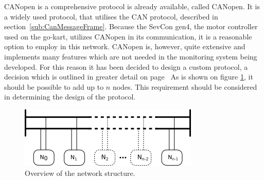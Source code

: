 CANopen is a comprehensive protocol is already available, called CANopen.
It is a widely used protocol, that utilises the CAN protocol, described in section~\ref{sub:CanMessageFrame}.
Because the SevCon gen4, the motor controller used on the go-kart, utilizes CANopen in its communication, it is a reasonable option to employ in this network.
CANopen is, however, quite extensive and implements many features which are not needed in the monitoring system being developed.
For this reason it has been decided to design a custom protocol, a decision which is outlined in greater detail on page~\pageref{sub:CANopen}
As is shown on figure \ref{fig:analysisnodes}, it should be possible to add up to $n$ nodes.
This requirement should be considered in determining the design of the protocol.

\begin{figure}
	\centering
	\includegraphics[width=.75\linewidth]{graphics/analysis_nodes}
	\caption{Overview of the network structure.}
	\label{fig:analysisnodes}
\end{figure}

